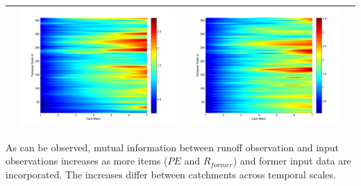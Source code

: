 \documentclass[11pt]{article}
\begin{document}
\begin{table}[H]
{\begin{tabular}{cccc}
&\begin{minipage}{.3\textwidth}\includegraphics[width=\linewidth]{resultgraph/06810000pep.png}\end{minipage}
&\begin{minipage}{.3\textwidth}\includegraphics[width=\linewidth]{resultgraph/06810000pepq.png}\end{minipage}
\\
\bottomrule
\end{tabular}
}
\end{table}

As can be observed, mutual information between runoff observation and input observations increases as more items ($PE$ and $R_{former}$) and former input data are incorporated. The increases differ between catchments across temporal scales.  
\end{document}
